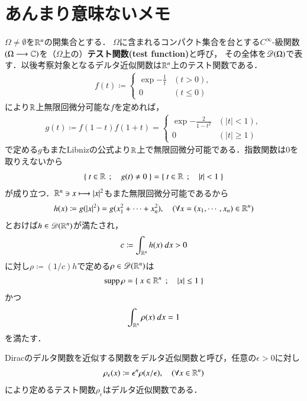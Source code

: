 \section{あんまり意味ないメモ}
	$\Omega \neq \emptyset$を$\mathbb{R}^n$の開集合とする．
	$\Omega$に含まれるコンパクト集合を台とする$C^\infty$-級関数$(\Omega \longrightarrow \mathbb{C})$を（$\Omega$上の）{\bf テスト関数(test function)}と呼び，
	その全体を$\mathscr{D}(\Omega)$で表す．以後考察対象となるデルタ近似関数は$\mathbb{R}^n$上のテスト関数である．
	\begin{align}
		f(t) \coloneqq 
		\begin{cases}
			\exp{-\frac{1}{t}} & (t > 0), \\
			0 & (t \leq 0)
		\end{cases}
	\end{align}
	により$\mathbb{R}$上無限回微分可能な$f$を定めれば，
	\begin{align}
		g(t) \coloneqq f(1-t)f(1+t) = 
		\begin{cases}
			\exp{-\frac{2}{1-t^2}} & (|t| < 1), \\
			0 & (|t| \geq 1)
		\end{cases}
	\end{align}
	で定める$g$もまたLibnizの公式より$\mathbb{R}$上で無限回微分可能である．指数関数は0を取りえないから
	\begin{align}
		\left\{\ t \in \mathbb{R}\ \, ; \quad g(t) \neq 0\ \right\} = \left\{\ t \in \mathbb{R}\ \, ; \quad |t| < 1\ \right\}
	\end{align}
	が成り立つ．$\mathbb{R}^n \ni x \longmapsto |x|^2$もまた無限回微分可能であるから
	\begin{align}
		h(x) \coloneqq g(|x|^2) = g(x_1^2+ \cdots + x_n^2),
		\quad (\forall x=(x_1,\cdots,x_n) \in \mathbb{R}^n)
	\end{align}
	とおけば$h \in \mathscr{D}(\mathbb{R}^n)$が満たされ，
	\begin{align}
		c \coloneqq \int_{\mathbb{R}^n} h(x)\ dx > 0
	\end{align}
	に対し$\rho \coloneqq (1/c)h$で定める$\rho \in \mathscr{D}(\mathbb{R}^n)$は
	\begin{align}
		\operatorname{supp} \rho = \left\{\ x \in \mathbb{R}^n\ \, ; \quad |x| \leq 1\ \right\}
	\end{align}
	かつ
	\begin{align}
		\int_{\mathbb{R}^n} \rho(x)\ dx = 1
	\end{align}
	を満たす．
	
	\begin{screen}
		\begin{dfn}[デルタ近似関数]
			Diracのデルタ関数を近似する関数をデルタ近似関数と呼び，任意の$\epsilon > 0$に対し
			\begin{align}
				\rho_\epsilon(x) \coloneqq \epsilon^n \rho(x/\epsilon),
				\quad (\forall x \in \mathbb{R}^n)
			\end{align}
			により定めるテスト関数$\rho_\epsilon$はデルタ近似関数である．
		\end{dfn}
	\end{screen}
	
